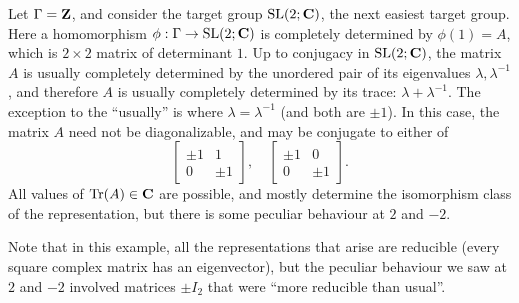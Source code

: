 \documentclass[11pt, oneside, usenames, dvipsnames, svgnames, table, final]{amsart}
\begin{document}
\begin{example}
  Let $\Gamma = \mathbf{Z}$, and consider the target group $\operatorname{SL}(2; \mathbf{C})$, the next easiest target group. Here a homomorphism $\phi : \Gamma \to \operatorname{SL}(2; \mathbf{C})$ is completely determined by
  $\phi(1)=A$, which is $2\times 2$ matrix of determinant $1$. Up to conjugacy in $\operatorname{SL}(2; \mathbf{C})$, the matrix $A$ is
  usually completely determined by the unordered pair of its eigenvalues $\lambda, \lambda^{-1}$, and therefore $A$ is
  usually completely determined by its trace: $\lambda + \lambda^{-1}$. The exception to the ``usually'' is where
  $\lambda =  \lambda^{-1}$ (and both are $\pm 1$). In this case, the matrix $A$ need not be diagonalizable, and may be conjugate to either
  of
  \[
    \begin{bmatrix}
     \pm  1 & 1 \\ 0 &  \pm 1 
    \end{bmatrix}, \quad
    \begin{bmatrix}
     \pm 1 & 0 \\ 0 & \pm 1 
    \end{bmatrix}.
  \]
  All values of $\operatorname{Tr}(A) \in \mathbf{C}$ are possible, and mostly determine the isomorphism class of the representation, but
  there is some peculiar behaviour at $2$ and $-2$.

  Note that in this example, all the representations that arise are reducible (every square complex matrix has an
  eigenvector), but the peculiar behaviour we saw at $2$ and $-2$ involved matrices $\pm I_2$ that were ``more reducible
  than usual''.
\end{example}
\end{document}
